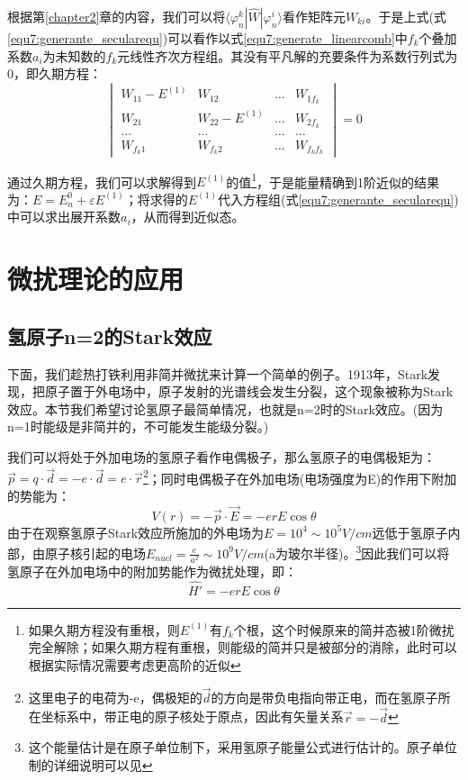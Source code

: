 根据第\ref{chapter2}章的内容，我们可以将$\langle\varphi_n^k|\hat{W}|\varphi_n^i\rangle$看作矩阵元$W_{ki}$。于是上式(式\eqref{equ7:generante_secularequ})可以看作以式\eqref{equ7:generate_linearcomb}中$f_k$个叠加系数$a_i$为未知数的$f_k$元线性齐次方程组。其没有平凡解的充要条件为系数行列式为0，即久期方程：
\begin{equation}\label{equ7:secularequ}
    \begin{vmatrix}
    W_{11}-E^{(1)} & W_{12} & \dots & W_{1f_k}\\
    W_{21} & W_{22}-E^{(1)} & \dots & W_{2f_k}\\
    \dots & \dots & \dots & \dots\\
    W_{f_k1} & W_{f_k2} & \dots & W_{f_kf_k}
    \end{vmatrix}=0
\end{equation}

通过久期方程，我们可以求解得到$E^{(1)}$的值\footnote{如果久期方程没有重根，则$E^{(1)}$有$f_k$个根，这个时候原来的简并态被1阶微扰完全解除；如果久期方程有重根，则能级的简并只是被部分的消除，此时可以根据实际情况需要考虑更高阶的近似}，于是能量精确到1阶近似的结果为：$E=E_n^0+\varepsilon E^{(1)}$；将求得的$E^{(1)}$代入方程组(式\eqref{equ7:generante_secularequ})中可以求出展开系数$a_i$，从而得到近似态。

\section{微扰理论的应用}
\subsection{氢原子n=2的Stark效应}
下面，我们趁热打铁利用非简并微扰来计算一个简单的例子。1913年，Stark发现，把原子置于外电场中，原子发射的光谱线会发生分裂，这个现象被称为Stark效应。本节我们希望讨论氢原子最简单情况，也就是n=2时的Stark效应。(因为n=1时能级是非简并的，不可能发生能级分裂。)

我们可以将处于外加电场的氢原子看作电偶极子，那么氢原子的电偶极矩为：$\Vec{p}=q\cdot \Vec{d}=-e\cdot\Vec{d}=e\cdot \Vec{r}$\footnote{这里电子的电荷为-e，偶极矩的$\Vec{d}$的方向是带负电指向带正电，而在氢原子所在坐标系中，带正电的原子核处于原点，因此有矢量关系$\Vec{r}=-\Vec{d}$}；同时电偶极子在外加电场(电场强度为E)的作用下附加的势能为：
\begin{equation}
    V(r)=-\Vec{p}\cdot \Vec{E}=-erE\cos\theta
\end{equation}
由于在观察氢原子Stark效应所施加的外电场为$E=10^{4}\sim 10^5 V/cm$远低于氢原子内部，由原子核引起的电场$E_{nucl}=\frac{e}{a^2}\sim 10^9 V/cm$(a为玻尔半径)。\footnote{这个能量估计是在原子单位制下，采用氢原子能量公式进行估计的。原子单位制的详细说明可以见}因此我们可以将氢原子在外加电场中的附加势能作为微扰处理，即：
\begin{equation}\label{equ7:starks_weirao}
    \hat{H'}=-erE\cos\theta
\end{equation}

